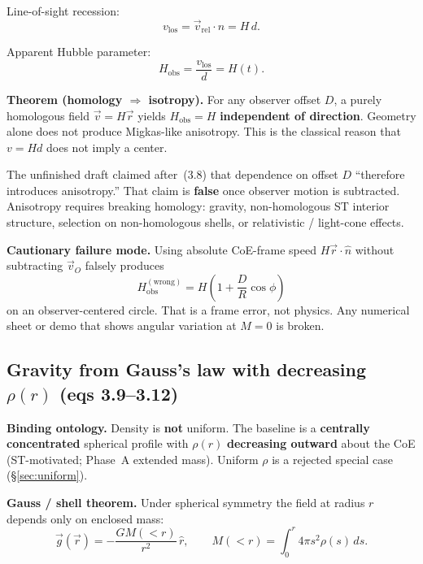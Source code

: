 \documentclass[11pt,a4paper]{article}
\begin{document}
Line-of-sight recession:
\begin{equation}
v_{\mathrm{los}}=\vec{v}_{\mathrm{rel}}\cdot\hat{n}=H\,d. \tag{3.7}\label{eq:3.7}
\end{equation}

Apparent Hubble parameter:
\begin{equation}
H_{\mathrm{obs}}=\frac{v_{\mathrm{los}}}{d}=H(t). \tag{3.8}\label{eq:3.8}
\end{equation}

\textbf{Theorem (homology \(\Rightarrow\) isotropy).} For any observer offset \(D\), a purely homologous field \(\vec{v}=H\vec{r}\) yields \(H_{\mathrm{obs}}=H\) \textbf{independent of direction}. Geometry alone does not produce Migkas-like anisotropy. This is the classical reason that \(v=Hd\) does not imply a center.

The unfinished draft claimed after~(3.8) that dependence on offset \(D\) ``therefore introduces anisotropy.'' That claim is \textbf{false} once observer motion is subtracted. Anisotropy requires breaking homology: gravity, non-homologous ST interior structure, selection on non-homologous shells, or relativistic / light-cone effects.

\textbf{Cautionary failure mode.} Using absolute CoE-frame speed \(H\vec{r}\cdot\hat{n}\) without subtracting \(\vec{v}_O\) falsely produces
\[
H_{\mathrm{obs}}^{\mathrm{(wrong)}}=H\left(1+\frac{D}{R}\cos\phi\right)
\]
on an observer-centered circle. That is a frame error, not physics. Any numerical sheet or demo that shows angular variation at \(M=0\) is broken.

\subsection{Gravity from Gauss's law with decreasing \(\rho(r)\) (eqs 3.9--3.12)}

\textbf{Binding ontology.} Density is \textbf{not} uniform. The baseline is a \textbf{centrally concentrated} spherical profile with \(\rho(r)\) \textbf{decreasing outward} about the CoE (ST-motivated; Phase~A extended mass). Uniform \(\rho\) is a rejected special case (\S\ref{sec:uniform}).

\textbf{Gauss / shell theorem.} Under spherical symmetry the field at radius \(r\) depends only on enclosed mass:
\begin{equation}
\vec{g}(\vec{r})=-\frac{G M(<r)}{r^2}\,\hat{r},\qquad
M(<r)=\int_0^r 4\pi s^2\rho(s)\,ds. \tag{3.9}\label{eq:3.9}
\end{equation}
\end{document}
